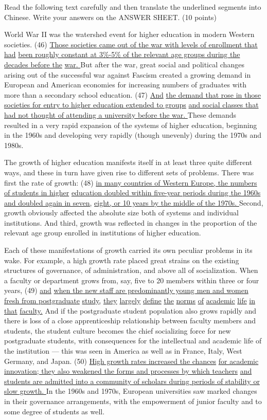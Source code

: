\documentclass[UTF8,11pt]{ctexart}
\begin{document}
Read the following text carefully and then translate the underlined segments into Chinese. Write your answers on the ANSWER SHEET. (10 points)


World War II was the watershed event for higher education in modern Western societies. (46) \uline{Those societies came out of the war with levels of enrollment that had} \uline{been roughly constant at 3\%-5\% of the relevant age groups during the decades before the} \uline{war. }But after the war, great social and political changes arising out of the successful war against Fascism created a growing demand in European and American economies for increasing numbers of graduates with more than a secondary school education. (47) \uline{And} \uline{the demand that rose in those societies for entry to higher education extended to groups} \uline{and social classes that had not thought of attending a university before the war. }These demands resulted in a very rapid expansion of the systems of higher education, beginning in the 1960s and developing very rapidly (though unevenly) during the 1970s and 1980s.


The growth of higher education manifests itself in at least three quite different ways, and these in turn have given rise to different sets of problems. There was first the rate of growth: (48) \uline{in many countries of Western Europe, the numbers of students in higher} \uline{education doubled within five-year periods during the 1960s and doubled again in seven,} \uline{eight, or 10 years by the middle of the 1970s. }Second, growth obviously affected the absolute size both of systems and individual institutions. And third, growth was reflected in changes in the proportion of the relevant age group enrolled in institutions of higher education.


Each of these manifestations of growth carried its own peculiar problems in its wake. For example, a high growth rate placed great strains on the existing structures of governance, of administration, and above all of socialization. When a faculty or department grows from, say, five to 20 members within three or four years, (49) \uline{and} \uline{when the new staff are predominantly young men and women fresh from postgraduate} \uline{study,} \uline{they} \uline{largely} \uline{define} \uline{the} \uline{norms} \uline{of} \uline{academic} \uline{life} \uline{in} \uline{that} \uline{faculty.} And if the postgraduate student population also grows rapidly and there is loss of a close apprenticeship relationship between faculty members and students, the student culture becomes the chief socializing force for new postgraduate students, with consequences for the intellectual and academic life of the institution — this was seen in America as well as in France, Italy, West Germany, and Japan. (50) \uline{High growth rates increased the chances} \uline{for academic innovation; they also weakened the forms and processes by which teachers} \uline{and students are admitted into a community of scholars during periods of stability or} \uline{slow growth. }In the 1960s and 1970s, European universities saw marked changes in their governance arrangements, with the empowerment of junior faculty and to some degree of students as well.
\end{document}
